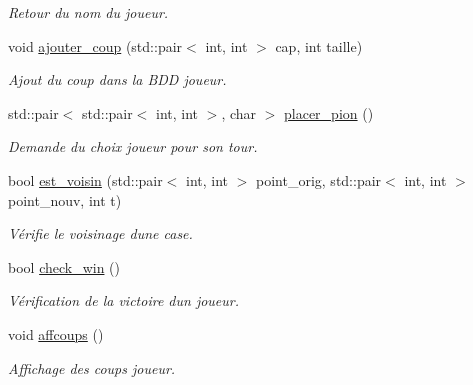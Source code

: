 \begin{DoxyCompactItemize}
\begin{DoxyCompactList}\small\item\em Retour du nom du joueur. \end{DoxyCompactList}\item 
void \hyperlink{classplayer_aec3e561bd70f63c9b1dd0614afc2971a}{ajouter\+\_\+coup} (std\+::pair$<$ int, int $>$ cap, int taille)
\begin{DoxyCompactList}\small\item\em Ajout du coup dans la B\+DD joueur. \end{DoxyCompactList}\item 
std\+::pair$<$ std\+::pair$<$ int, int $>$, char $>$ \hyperlink{classplayer_a34f3624d4410230ab77ce6ee7fb0a0df}{placer\+\_\+pion} ()
\begin{DoxyCompactList}\small\item\em Demande du choix joueur pour son tour. \end{DoxyCompactList}\item 
bool \hyperlink{classplayer_a24a75aa099e5a4eac97d3898fde40a3b}{est\+\_\+voisin} (std\+::pair$<$ int, int $>$ point\+\_\+orig, std\+::pair$<$ int, int $>$ point\+\_\+nouv, int t)
\begin{DoxyCompactList}\small\item\em Vérifie le voisinage d\textquotesingle{}une case. \end{DoxyCompactList}\item 
bool \hyperlink{classplayer_a5eddf905f6904f5737b4f36f7f0ab428}{check\+\_\+win} ()
\begin{DoxyCompactList}\small\item\em Vérification de la victoire d\textquotesingle{}un joueur. \end{DoxyCompactList}\item 
void \hyperlink{classplayer_a2590189e7416dc8a5cf2686a606f138b}{affcoups} ()
\begin{DoxyCompactList}\small\item\em Affichage des coups joueur. \end{DoxyCompactList}\end{DoxyCompactItemize}
